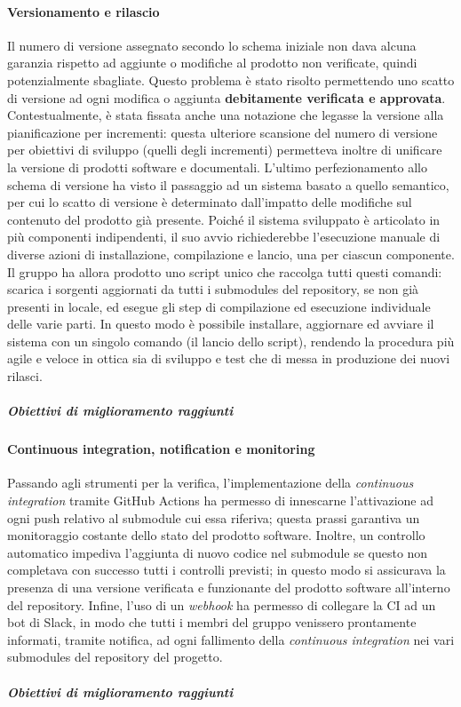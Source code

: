 			\paragraph{Versionamento e rilascio}
				Il numero di versione assegnato secondo lo schema iniziale non dava alcuna garanzia rispetto ad aggiunte o modifiche al prodotto non verificate, quindi potenzialmente sbagliate. Questo problema è stato risolto permettendo uno scatto di versione ad ogni modifica o aggiunta \textbf{debitamente verificata e approvata}. Contestualmente, è stata fissata anche una notazione che legasse la versione alla pianificazione per incrementi: questa ulteriore scansione del numero di versione per obiettivi di sviluppo (quelli degli incrementi) permetteva inoltre di unificare la versione di prodotti software e documentali. L'ultimo perfezionamento allo schema di versione ha visto il passaggio ad un sistema basato a quello semantico, per cui lo scatto di versione è determinato dall'impatto delle modifiche sul contenuto del prodotto già presente.
				\newline
				Poiché il sistema sviluppato è articolato in più componenti indipendenti, il suo avvio richiederebbe l'esecuzione manuale di diverse azioni di installazione, compilazione e lancio, una per ciascun componente. Il gruppo ha allora prodotto uno script unico che raccolga tutti questi comandi: scarica i sorgenti aggiornati da tutti i submodules del repository, se non già presenti in locale, ed esegue gli step di compilazione ed esecuzione individuale delle varie parti. In questo modo è possibile installare, aggiornare ed avviare il sistema con un singolo comando (il lancio dello script), rendendo la procedura più agile e veloce in ottica sia di sviluppo e test che di messa in produzione dei nuovi rilasci.
				
				\subparagraph{Obiettivi di miglioramento raggiunti}
			
			\paragraph{Continuous integration, notification e monitoring}
				Passando agli strumenti per la verifica, l'implementazione della \textit{continuous integration} tramite GitHub Actions ha permesso di innescarne l'attivazione ad ogni push relativo al submodule cui essa riferiva; questa prassi garantiva un monitoraggio costante dello stato del prodotto software. Inoltre, un controllo automatico impediva l'aggiunta di nuovo codice nel submodule se questo non completava con successo tutti i controlli previsti; in questo modo si assicurava la presenza di una versione verificata e funzionante del prodotto software all'interno del repository. Infine, l'uso di un \textit{webhook} ha permesso di collegare la CI ad un bot di Slack, in modo che tutti i membri del gruppo venissero prontamente informati, tramite notifica, ad ogni fallimento della \textit{continuous integration} nei vari submodules del repository del progetto.
				
				\subparagraph{Obiettivi di miglioramento raggiunti}

